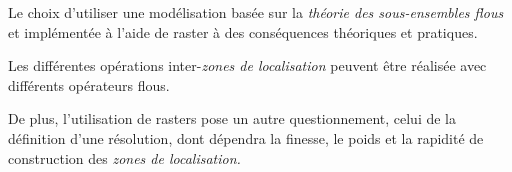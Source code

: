 Le choix d'utiliser une modélisation basée sur la \emph{théorie des
  sous-ensembles flous} et implémentée à l'aide de raster à des
conséquences théoriques et pratiques.


Les différentes opérations inter-\emph{zones de localisation} peuvent
être réalisée avec différents opérateurs flous.


De plus, l'utilisation de rasters pose un autre questionnement, celui
de la définition d'une résolution, dont dépendra la finesse, le poids
et la rapidité de construction des \emph{zones de localisation.}

